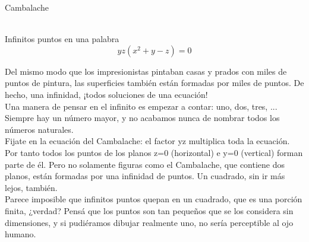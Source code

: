 \documentclass[es]{SurferDesc}%
\begin{document}
\footnotesize


\begin{surferPage}
  \begin{surferTitle}Cambalache \end{surferTitle}   \\
Infinitos puntos en una palabra\\
\smallskip
\[y z (x^2	+ y - z)	= 0\]

\vspace{0.3cm}
Del mismo modo que los impresionistas pintaban casas y prados con miles de puntos de pintura, las
superficies tambi\'en est\'an formadas por miles de puntos. De hecho, una infinidad, ¡todos soluciones de
una ecuaci\'on!\\
\vspace{0.3cm}
Una manera de pensar en el infinito es empezar a contar: uno, dos, tres, ... Siempre hay un n\'umero mayor, y no acabamos nunca de nombrar todos los n\'umeros naturales.\\
\vspace{0.3cm}
Fijate en la ecuaci\'on del Cambalache: el factor yz multiplica toda la ecuaci\'on. Por tanto todos los puntos
de los planos z=0 (horizontal) e y=0 (vertical) forman parte de \'el.
Pero no solamente figuras como el Cambalache, que contiene dos planos, est\'an formadas por una infinidad de
puntos. Un cuadrado, sin ir m\'as lejos, tambi\'en.\\
\vspace{0.3cm}
Parece imposible que infinitos puntos quepan en un cuadrado, que es una porci\'on finita, ¿verdad? Pens\'a
que los puntos son tan pequeños que se los considera sin dimensiones, y si pudi\'eramos dibujar realmente
uno, no ser\'ia perceptible al ojo humano.

  \begin{surferText}
     \end{surferText}
\end{surferPage}
\end{document}
